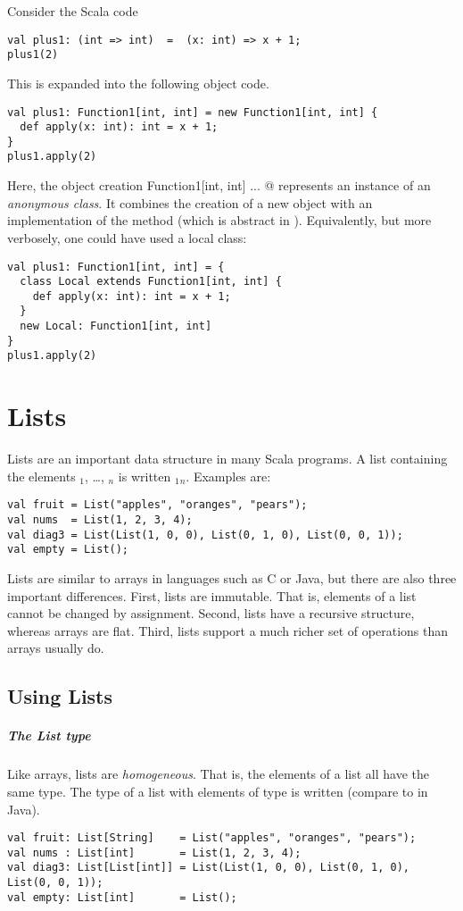 \example Consider the Scala code
\begin{lstlisting}
val plus1: (int => int)  =  (x: int) => x + 1;
plus1(2)
\end{lstlisting}
This is expanded into the following object code.
\begin{lstlisting}
val plus1: Function1[int, int] = new Function1[int, int] {
  def apply(x: int): int = x + 1;
}
plus1.apply(2)
\end{lstlisting}
Here, the object creation \lstinline@new Function1[int, int]{ ... }@
represents an instance of an {\em anonymous class}. It combines the
creation of a new  object with an implementation of 
the  method (which is abstract in ).
Equivalently, but more verbosely, one could have used a local class:
\begin{lstlisting}
val plus1: Function1[int, int] = {
  class Local extends Function1[int, int] {
    def apply(x: int): int = x + 1;
  }
  new Local: Function1[int, int]
}
plus1.apply(2)
\end{lstlisting}
 
\chapter{Lists}

Lists are an important data structure in many Scala programs.  
A list containing the elements $_1$, \ldots, $_n$ is written
$_1$$_n$\code{)}. Examples are:
\begin{lstlisting}
val fruit = List("apples", "oranges", "pears");
val nums  = List(1, 2, 3, 4);
val diag3 = List(List(1, 0, 0), List(0, 1, 0), List(0, 0, 1));
val empty = List();
\end{lstlisting}
Lists are similar to arrays in languages such as C or Java, but there
are also three important differences. First, lists are immutable. That
is, elements of a list cannot be changed by assignment. Second, 
lists have a recursive structure, whereas arrays are flat. Third,
lists support a much richer set of operations than arrays usually do.

\section{Using Lists}

\paragraph{The List type}
Like arrays, lists are {\em homogeneous}. That is, the elements of a
list all have the same type.  The type of a list with elements of type
 is written  (compare to  in Java).
\begin{lstlisting}
val fruit: List[String]    = List("apples", "oranges", "pears");
val nums : List[int]       = List(1, 2, 3, 4);
val diag3: List[List[int]] = List(List(1, 0, 0), List(0, 1, 0), List(0, 0, 1));
val empty: List[int]       = List();
\end{lstlisting}

